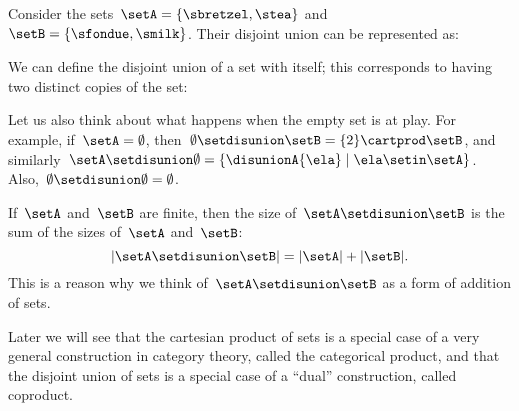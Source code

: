 Consider the sets~$\setA=\{\sbretzel, \stea\}$ and~$\setB=\{\sfondue, \smilk\}$.
Their disjoint union can be represented as:

We can define the disjoint union of a set with itself; this corresponds to having two distinct copies of the set:

Let us also think about what happens when the empty set is at play.
For example, if~$\setA = \emptyset$, then~$\emptyset \setdisunion \setB =  \{2\} \cartprod \setB$, and similarly~$\setA \setdisunion \emptyset =  \{ \disunionA{\ela} \mid \ela \setin\setA \}$.
Also,~$\emptyset \setdisunion \emptyset = \emptyset$.

\begin{remark}
    If~$\setA$ and~$\setB$ are finite, then the size of~$\setA \setdisunion \setB$ is the sum of the sizes of~$\setA$ and~$\setB$:
    \begin{equation*}
        \vert \setA \setdisunion \setB \vert = \vert \setA \vert + \vert \setB \vert.
    \end{equation*}
    This is a reason why we think of~$\setA \setdisunion \setB$ as a form of addition of sets.
\end{remark}

\begin{remark}
    Later we will see that the cartesian product of sets is a special case of a very general construction in category theory, called the categorical product, and that the disjoint union of sets is a special case of a ``dual'' construction, called coproduct.
\end{remark}
